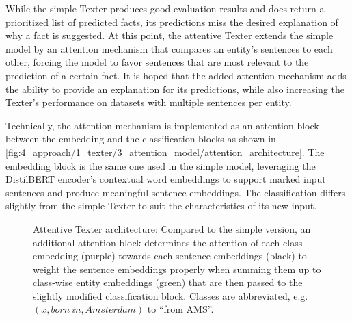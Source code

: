 While the simple Texter produces good evaluation results and does return a prioritized list of predicted facts, its predictions miss the desired explanation of why a fact is suggested. At this point, the attentive Texter extends the simple model by an attention mechanism that compares an entity's sentences to each other, forcing the model to favor sentences that are most relevant to the prediction of a certain fact. It is hoped that the added attention mechanism adds the ability to provide an explanation for its predictions, while also increasing the Texter's performance on datasets with multiple sentences per entity.

Technically, the attention mechanism is implemented as an attention block between the embedding and the classification blocks as shown in \autoref{fig:4_approach/1_texter/3_attention_model/attention_architecture}. The embedding block is the same one used in the simple model, leveraging the DistilBERT encoder's contextual word embeddings to support marked input sentences and produce meaningful sentence embeddings. The classification differs slightly from the simple Texter to suit the characteristics of its new input.

\begin{figure}[t]
    \caption{Attentive Texter architecture: Compared to the simple version, an additional attention block determines the attention of each class embedding (purple) towards each sentence embeddings (black) to weight the sentence embeddings properly when summing them up to class-wise entity embeddings (green) that are then passed to the slightly modified classification block. Classes are abbreviated, e.g. $(x, born~in, Amsterdam)$ to ``from AMS''.}
    \label{fig:4_approach/1_texter/3_attention_model/attention_architecture}
\end{figure}

